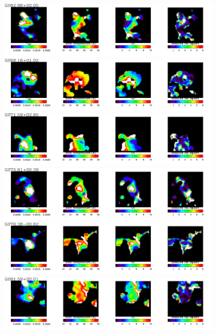   \begin{figure}
\centering
\includegraphics[trim=0 2mm 0 0, clip, width=190mm]{appA/appA_18.pdf}
\includegraphics[trim=0 2mm 0 0, clip, width=190mm]{appA/appA_19.pdf}
\includegraphics[trim=0 2mm 0 0, clip, width=190mm]{appA/appA_20.pdf}
\includegraphics[trim=0 2mm 0 0, clip, width=190mm]{appA/appA_21.pdf}
\includegraphics[trim=0 2mm 0 0, clip, width=190mm]{appA/appA_22.pdf}
\includegraphics[trim=0 2mm 0 0, clip, width=190mm]{appA/appA_23.pdf}
  \end{figure}
  
